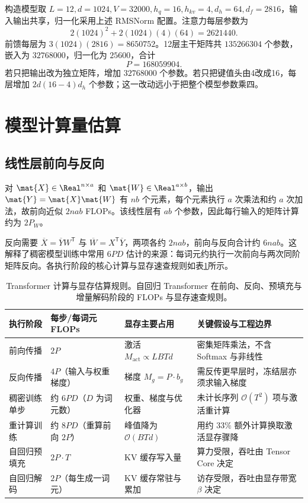 \documentclass[../textbook.tex]{subfiles}
\begin{document}
\begin{example}[模型参数量核算]
构造模型取 $L=12,d=1024,V=32000,h_q=16,h_{kv}=4,d_h=64,d_f=2816$，输入输出共享，归一化采用上述 RMSNorm 配置。注意力每层参数为
\begin{equation*}
 2(1024)^2+2(1024)(4)(64)=2621440.
\end{equation*}
前馈每层为 $3(1024)(2816)=8650752$。12层主干矩阵共 $135266304$ 个参数，嵌入为 $32768000$，归一化为 $25600$，合计
\begin{equation*}
 P=168059904.
\end{equation*}
若只把输出改为独立矩阵，增加 $32768000$ 个参数。若只把键值头由4改成16，每层增加 $2d(16-4)d_h$ 个参数；这一改动远小于把整个模型参数乘四。
\end{example}

\section{模型计算量估算}

\subsection{线性层前向与反向}
对 $\mat{X}\in\Real^{n\times a}$ 和 $\mat{W}\in\Real^{a\times b}$，输出 $\mat{Y}=\mat{X}\mat{W}$ 有 $nb$ 个元素，每个元素执行 $a$ 次乘法和约 $a$ 次加法，故前向近似 $2nab$ FLOPs。该线性层有 $ab$ 个参数，因此每行输入的矩阵计算约为 $2P_W$。

反向需要 $\overline X=\overline YW^{\mathsf T}$ 与 $\overline W=X^{\mathsf T}\overline Y$，两项各约 $2nab$，前向与反向合计约 $6nab$。这解释了稠密模型训练中常用 $6PD$ 估计的来源：每词元约执行一次前向与两次同阶矩阵反向。各执行阶段的核心计算与显存速查规则如表\ref{tab:compute-rules}所示。

\begin{table}[htbp]
\centering
\small
\setlength{\tabcolsep}{3.5pt}
\caption[Transformer 计算与显存估算规则]{Transformer 计算与显存估算规则。自回归 Transformer 在前向、反向、预填充与增量解码阶段的 FLOPs 与显存速查规则。}\label{tab:compute-rules}
\begin{tabularx}{\linewidth}{lp{22mm}p{28mm}X}
\toprule
执行阶段 & 每步/每词元 FLOPs & 显存主要占用 & 关键假设与工程边界 \\
\midrule
前向传播 & $2P$ & 激活 $M_{\mathrm{act}} \propto L B T d$ & 密集矩阵乘法，不含 Softmax 与非线性 \\
反向传播 & $4P$（输入与权重梯度） & 梯度 $M_g = P \cdot b_g$ & 需反传更早层时，冻结层亦须求输入梯度 \\
稠密训练单步 & 约 $6PD$（$D$ 为词元数） & 权重、梯度与优化器 & 未计长序列 $\mathcal{O}(T^2)$ 项与激活重计算 \\
重计算训练 & 约 $8PD$（重算前向 $2P$） & 峰值降为 $\mathcal{O}(B T d)$ & 用约 $33\%$ 额外计算换取激活显存骤降 \\
自回归预填充 & $2P \cdot T$ & KV 缓存写入量 & 算力受限，吞吐由 Tensor Core 决定 \\
自回归解码 & $2P$（每生成一词元） & KV 缓存常驻与累加 & 访存受限，吞吐由显存带宽 $\beta$ 决定 \\
\bottomrule
\end{tabularx}
\end{table}
\end{document}
